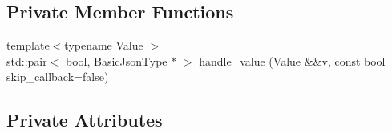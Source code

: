 \subsection*{Private Member Functions}
\begin{DoxyCompactItemize}
\item 
{\footnotesize template$<$typename Value $>$ }\\std\+::pair$<$ bool, Basic\+Json\+Type $\ast$ $>$ \hyperlink{classnlohmann_1_1detail_1_1json__sax__dom__callback__parser_a875e678e20e75b37b93b80be78fe60e6}{handle\+\_\+value} (Value \&\&v, const bool skip\+\_\+callback=false)
\end{DoxyCompactItemize}
\subsection*{Private Attributes}
